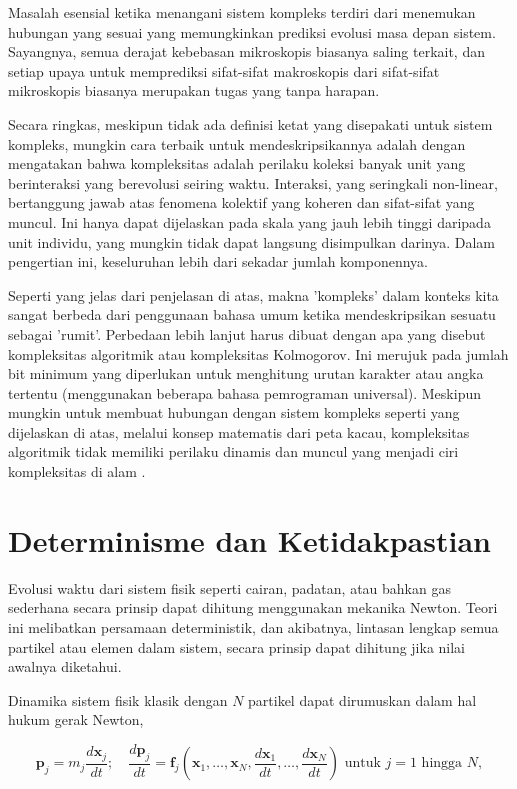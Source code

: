 \documentclass[a4paper,12pt]{book}
\begin{document}
Masalah esensial ketika menangani sistem kompleks terdiri dari menemukan hubungan yang sesuai yang memungkinkan prediksi evolusi masa depan sistem. Sayangnya, semua derajat kebebasan mikroskopis biasanya saling terkait, dan setiap upaya untuk memprediksi sifat-sifat makroskopis dari sifat-sifat mikroskopis biasanya merupakan tugas yang tanpa harapan.

Secara ringkas, meskipun tidak ada definisi ketat yang disepakati untuk sistem kompleks, mungkin cara terbaik untuk mendeskripsikannya adalah dengan mengatakan bahwa kompleksitas adalah perilaku koleksi banyak unit yang berinteraksi yang berevolusi seiring waktu. Interaksi, yang seringkali non-linear, bertanggung jawab atas fenomena kolektif yang koheren dan sifat-sifat yang muncul. Ini hanya dapat dijelaskan pada skala yang jauh lebih tinggi daripada unit individu, yang mungkin tidak dapat langsung disimpulkan darinya. Dalam pengertian ini, keseluruhan lebih dari sekadar jumlah komponennya.

Seperti yang jelas dari penjelasan di atas, makna 'kompleks' dalam konteks kita sangat berbeda dari penggunaan bahasa umum ketika mendeskripsikan sesuatu sebagai 'rumit'. Perbedaan lebih lanjut harus dibuat dengan apa yang disebut kompleksitas algoritmik atau kompleksitas Kolmogorov. Ini merujuk pada jumlah bit minimum yang diperlukan untuk menghitung urutan karakter atau angka tertentu (menggunakan beberapa bahasa pemrograman universal). Meskipun mungkin untuk membuat hubungan dengan sistem kompleks seperti yang dijelaskan di atas, melalui konsep matematis dari peta kacau, kompleksitas algoritmik tidak memiliki perilaku dinamis dan muncul yang menjadi ciri kompleksitas di alam \cite{nicolis2007}.

\section{Determinisme dan Ketidakpastian}
\label{sec:1.3}

Evolusi waktu dari sistem fisik seperti cairan, padatan, atau bahkan gas sederhana secara prinsip dapat dihitung menggunakan mekanika Newton. Teori ini melibatkan persamaan deterministik, dan akibatnya, lintasan lengkap semua partikel atau elemen dalam sistem, secara prinsip dapat dihitung jika nilai awalnya diketahui.

Dinamika sistem fisik klasik dengan $N$ partikel dapat dirumuskan dalam hal hukum gerak Newton,

\begin{equation}
\mathbf{p}_j = m_j \frac{d \mathbf{x}_j}{dt}; \quad \frac{d \mathbf{p}_j}{dt} = \mathbf{f}_j\left(\mathbf{x}_1, \ldots, \mathbf{x}_N, \frac{d \mathbf{x}_1}{dt}, \ldots, \frac{d \mathbf{x}_N}{dt}\right) \text{ untuk } j=1 \text{ hingga } N,
\label{eq:newton}
\end{equation}
\end{document}
